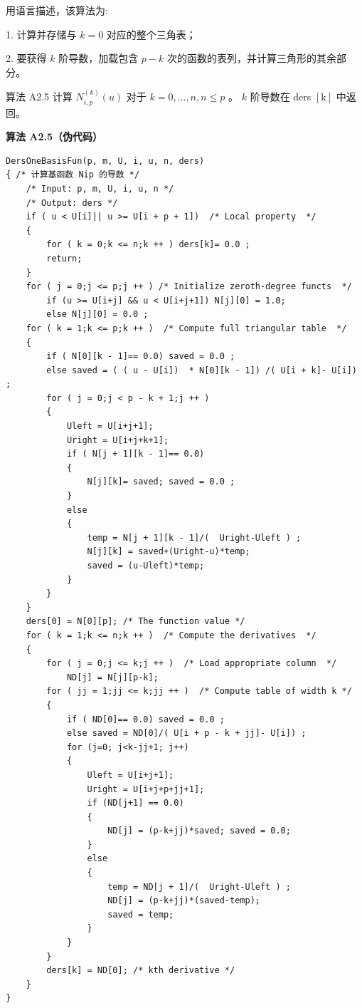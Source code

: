 \documentclass[../main.tex]{subfiles}
\begin{document}
用语言描述，该算法为:

1. 计算并存储与 \(k = 0\) 对应的整个三角表；

2. 要获得 \(k\) 阶导数，加载包含 \(p - k\) 次的函数的表列，并计算三角形的其余部分。

算法 A2.5 计算 \({N}_{i,p}^{\left( k\right) }\left( u\right)\) 对于 \(k = 0,\ldots ,n,n \leq  p\) 。 \(k\) 阶导数在 ders \(\left\lbrack  \mathrm{k}\right\rbrack\) 中返回。

\par\medskip\noindent\textbf{算法 A2.5（伪代码）}\par
\begin{verbatim}
DersOneBasisFun(p, m, U, i, u, n, ders)
{ /* 计算基函数 Nip 的导数 */
    /* Input: p, m, U, i, u, n */
    /* Output: ders */
    if ( u < U[i]|| u >= U[i + p + 1])  /* Local property  */
    {
        for ( k = 0;k <= n;k ++ ) ders[k]= 0.0 ;
        return;
    }
    for ( j = 0;j <= p;j ++ ) /* Initialize zeroth-degree functs  */
        if (u >= U[i+j] && u < U[i+j+1]) N[j][0] = 1.0;
        else N[j][0] = 0.0 ;
    for ( k = 1;k <= p;k ++ )  /* Compute full triangular table  */
    {
        if ( N[0][k - 1]== 0.0) saved = 0.0 ;
        else saved = ( ( u - U[i])  * N[0][k - 1]) /( U[i + k]- U[i]) ;
        for ( j = 0;j < p - k + 1;j ++ )
        {
            Uleft = U[i+j+1];
            Uright = U[i+j+k+1];
            if ( N[j + 1][k - 1]== 0.0)
            {
                N[j][k]= saved; saved = 0.0 ;
            }
            else
            {
                temp = N[j + 1][k - 1]/(  Uright-Uleft ) ;
                N[j][k] = saved+(Uright-u)*temp;
                saved = (u-Uleft)*temp;
            }
        }
    }
    ders[0] = N[0][p]; /* The function value */
    for ( k = 1;k <= n;k ++ )  /* Compute the derivatives  */
    {
        for ( j = 0;j <= k;j ++ )  /* Load appropriate column  */
            ND[j] = N[j][p-k];
        for ( jj = 1;jj <= k;jj ++ )  /* Compute table of width k */
        {
            if ( ND[0]== 0.0) saved = 0.0 ;
            else saved = ND[0]/( U[i + p - k + jj]- U[i]) ;
            for (j=0; j<k-jj+1; j++)
            {
                Uleft = U[i+j+1];
                Uright = U[i+j+p+jj+1];
                if (ND[j+1] == 0.0)
                {
                    ND[j] = (p-k+jj)*saved; saved = 0.0;
                }
                else
                {
                    temp = ND[j + 1]/(  Uright-Uleft ) ;
                    ND[j] = (p-k+jj)*(saved-temp);
                    saved = temp;
                }
            }
        }
        ders[k] = ND[0]; /* kth derivative */
    }
}
\end{verbatim}
\end{document}
